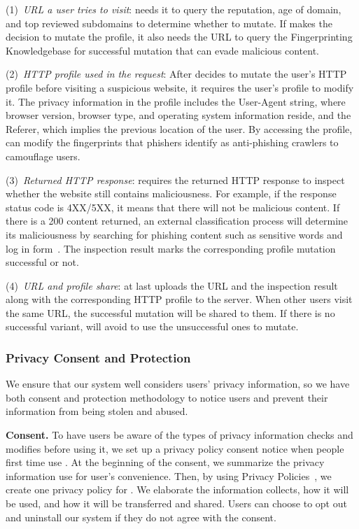 (1)~\emph{URL a user tries to visit}: \spartacus needs it to query the reputation, age of domain, and top reviewed subdomains to determine whether to mutate.
If \spartacus makes the decision to mutate the profile, it also needs the URL to query the Fingerprinting Knowledgebase for successful mutation that can evade malicious content.

(2)~\emph{HTTP profile used in the request}:
After \spartacus decides to mutate the user's HTTP profile before visiting a suspicious website, it requires the user's profile to modify it.
The privacy information in the profile includes the User-Agent string, where browser version, browser type, and operating system information reside, and the Referer, which implies the previous location of the user.
By accessing the profile, \spartacus can modify the fingerprints that phishers identify as anti-phishing crawlers to camouflage users.

(3)~\emph{Returned HTTP response}:
\spartacus requires the returned HTTP response to inspect whether the website still contains maliciousness.
For example, if the response status code is 4XX/5XX, it means that there will not be malicious content.
If there is a 200 content returned,
an external classification process will determine its maliciousness by searching for phishing content such as sensitive words and log in form~\cite{xiang2011cantina+}.
The inspection result marks the corresponding profile mutation successful or not.

(4)~\emph{URL and profile share}:
\spartacus at last uploads the URL and the inspection result along with the corresponding HTTP profile to the server.
When other users visit the same URL, the successful mutation will be shared to them.
If there is no successful variant, \spartacus will avoid to use the unsuccessful ones to mutate.


\subsubsection{Privacy Consent and Protection}

We ensure that our \spartacus system well considers users' privacy information,
so we have both consent and protection methodology to notice users and prevent their information from being stolen and abused.

\noindent
\textbf{Consent.}
To have users be aware of the types of privacy information \spartacus checks and modifies before using it,
we set up a privacy policy consent notice when people first time use \spartacus.
At the beginning of the consent, we summarize the privacy information \spartacus use for user's convenience.
Then, by using Privacy Policies~\cite{privacypolicy}, we create one privacy policy for \spartacus.
We elaborate the information \spartacus collects, how it will be used, and how it will be transferred and shared.
Users can choose to opt out and uninstall our system if they do not agree with the consent.

